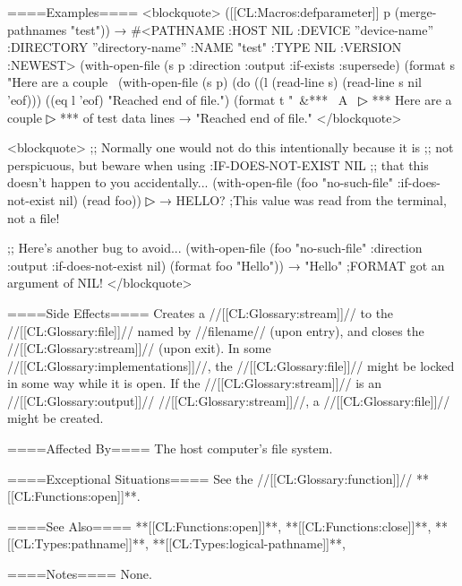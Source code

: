 ====Examples====
<blockquote> ([[CL:Macros:defparameter]] p (merge-pathnames "test")) → #<PATHNAME :HOST NIL :DEVICE ''device-name'' :DIRECTORY ''directory-name'' :NAME "test" :TYPE NIL :VERSION :NEWEST> (with-open-file (s p :direction :output :if-exists :supersede) (format s "Here are a couple~ (with-open-file (s p) (do ((l (read-line s) (read-line s nil 'eof))) ((eq l 'eof) "Reached end of file.") (format t "~&*** ~A~
▷ *** Here are a couple
▷ *** of test data lines → "Reached end of file." </blockquote>

<blockquote> ;; Normally one would not do this intentionally because it is ;; not perspicuous, but beware when using :IF-DOES-NOT-EXIST NIL ;; that this doesn't happen to you accidentally... (with-open-file (foo "no-such-file" :if-does-not-exist nil) (read foo))
▷  → HELLO? ;This value was read from the terminal, not a file!

;; Here's another bug to avoid... (with-open-file (foo "no-such-file" :direction :output :if-does-not-exist nil) (format foo "Hello")) → "Hello" ;FORMAT got an argument of NIL! </blockquote>

====Side Effects====
Creates a //[[CL:Glossary:stream]]// to the //[[CL:Glossary:file]]// named by //filename// (upon entry), and closes the //[[CL:Glossary:stream]]// (upon exit). In some //[[CL:Glossary:implementations]]//, the //[[CL:Glossary:file]]// might be locked in some way while it is open. If the //[[CL:Glossary:stream]]// is an //[[CL:Glossary:output]]// //[[CL:Glossary:stream]]//, a //[[CL:Glossary:file]]// might be created.

====Affected By====
The host computer's file system.

====Exceptional Situations====
See the //[[CL:Glossary:function]]// **[[CL:Functions:open]]**.

====See Also====
**[[CL:Functions:open]]**, **[[CL:Functions:close]]**, **[[CL:Types:pathname]]**, **[[CL:Types:logical-pathname]]**, {\secref\PathnamesAsFilenames}

====Notes====
None.

           
